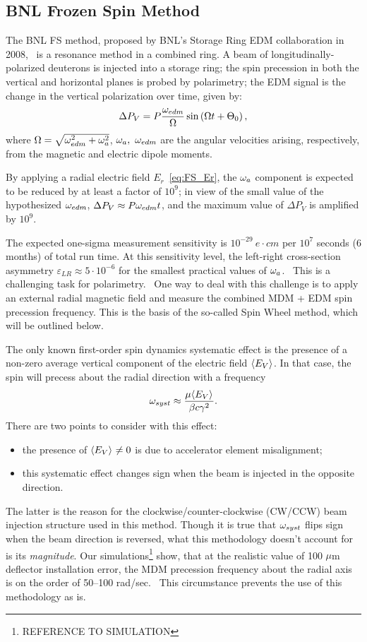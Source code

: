 \documentclass{article}
\begin{document}
\subsection{BNL Frozen Spin Method}
The BNL FS method, proposed by BNL's Storage Ring EDM collaboration in 2008,~\cite{BNL:Deuteron2008} is a resonance method in a combined ring. A beam of longitudinally-polarized deuterons is injected into a storage ring; the spin precession in both the vertical and horizontal planes  is probed by polarimetry; the EDM signal is the change in the vertical polarization over time, given by:~\cite[p. 8]{BNL:Deuteron2008}
\begin{equation}
  \Delta P_V = P\frac{\w_{edm}}{\W}\sin\bkt{\W t + \Theta_0},
\end{equation}
where $\Omega = \sqrt{\omega_{edm}^2 + \omega_a^2}$, $\omega_a,~\omega_{edm}$ are the angular velocities arising, respectively, from the magnetic and electric dipole moments.

By applying a radial electric field $E_r$~\eqref{eq:FS_Er}, the $\omega_a$ component is expected to be reduced by at least a factor of $10^9$; in view of the small value of the hypothesized $\omega_{edm}$, $\Delta P_V \approx P \omega_{edm} t$, and the maximum value of $\Delta P_V$ is amplified by $10^9$.

The expected one-sigma measurement sensitivity is $10^{-29}~e\cdot cm$ per $10^7$ seconds (6 months) of total run time. At this sensitivity level, the left-right cross-section asymmetry $\varepsilon_{LR} \approx 5\cdot 10^{-6}$ for the smallest practical values of $\omega_a$.~\cite[p. 18]{BNL:Deuteron2008} This is a challenging task for polarimetry.~\cite{Mane:SpinWheel} One way to deal with this challenge is to apply an external radial magnetic field and measure the combined MDM + EDM spin precession frequency. This is the basis of the so-called Spin Wheel method, which will be outlined below.

The only known first-order spin dynamics systematic effect is the presence of a non-zero average vertical component of the electric field $\avg{E_V}$. In that case, the spin will precess about the radial direction with a frequency~\cite[p. 11]{BNL:Deuteron2008}
\[
\w_{syst} \approx \frac{\mu\avg{E_V}}{\beta c\gamma^2}.
\]
There are two points to consider with this effect:
\begin{itemize}
\item the presence of $\avg{E_V}\neq 0$ is due to accelerator element misalignment;
\item this systematic effect changes sign when the beam is injected in the opposite direction.
\end{itemize}
The latter is the reason for the clockwise/counter-clockwise (CW/CCW) beam injection structure used in this method. Though it is true that $\omega_{syst}$ flips sign when the beam direction is reversed, what this methodology doesn't account for is its \emph{magnitude}. Our simulations\footnote{REFERENCE TO SIMULATION} show, that at the realistic value of 100 $\mu$m deflector installation error, the MDM precession frequency about the radial axis is on the order of 50--100 rad/sec.~\cite{Senichev:FDM} This circumstance prevents the use of this methodology as is.
\end{document}

